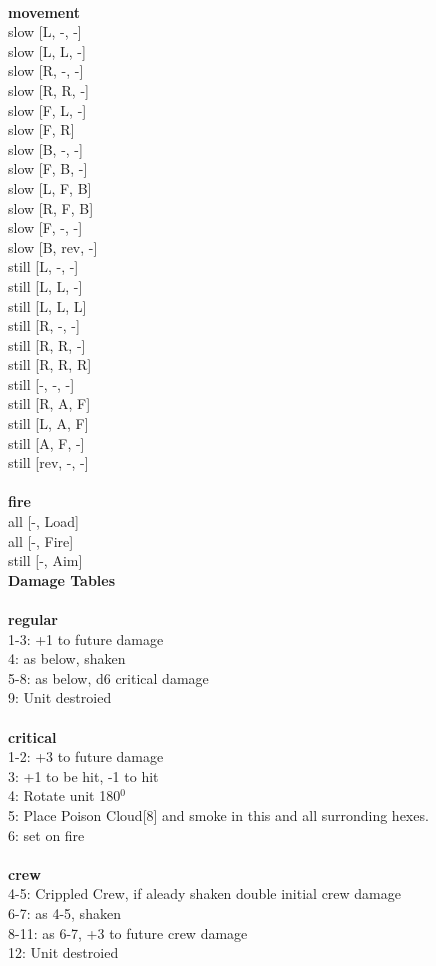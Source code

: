 \ \\ {\bf movement } \\
slow [L, -, -] \\
slow [L, L, -] \\
slow [R, -, -] \\
slow [R, R, -] \\
slow [F, L, -] \\
slow [F, R] \\
slow [B, -, -] \\
slow [F, B, -] \\
slow [L, F, B] \\
slow [R, F, B] \\
slow [F, -, -] \\
slow [B, rev, -] \\
still [L, -, -] \\
still [L, L, -] \\
still [L, L, L] \\
still [R, -, -] \\
still [R, R, -] \\
still [R, R, R] \\
still [-, -, -] \\
still [R, A, F] \\
still [L, A, F] \\
still [A, F, -] \\
still [rev, -, -] \\
\ \\ {\bf fire } \\
all [-, Load] \\
all [-, Fire] \\
still [-, Aim] \\


{\bf Damage Tables} \\
\ \\ {\bf regular } \\
1-3: +1 to future damage \\
4: as below, shaken \\
5-8: as below, d6 critical damage \\
9: Unit destroied \\
\ \\ {\bf critical } \\
1-2: +3 to future damage \\
3: +1 to be hit, -1 to hit \\
4: Rotate unit 180$^0$ \\
5: Place Poison Cloud[8] and smoke in this and all surronding hexes. \\
6: set on fire \\
\ \\ {\bf crew } \\
4-5: Crippled Crew, if aleady shaken double initial crew damage \\
6-7: as 4-5, shaken \\
8-11: as 6-7, +3 to future crew damage \\
12: Unit destroied \\










